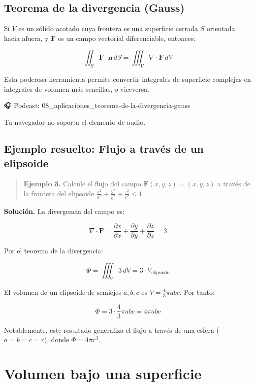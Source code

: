 \documentclass[
]{book}
\begin{document}
\subsection{Teorema de la divergencia (Gauss)}\label{teorema-de-la-divergencia-gauss}

Si \(V\) es un sólido acotado cuya frontera es una superficie cerrada \(S\) orientada hacia afuera, y \(\mathbf{F}\) es un campo vectorial diferenciable, entonces:

\[
\iint_S \mathbf{F} \cdot \mathbf{n} \, dS = \iiint_V \nabla \cdot \mathbf{F} \, dV
\]

Esta poderosa herramienta permite convertir integrales de superficie complejas en integrales de volumen más sencillas, o viceversa.

🎧 Podcast: 08\_aplicaciones\_teorema-de-la-divergencia-gauss

Tu navegador no soporta el elemento de audio.

\subsection{Ejemplo resuelto: Flujo a través de un elipsoide}\label{ejemplo-resuelto-flujo-a-travuxe9s-de-un-elipsoide}

\begin{quote}
\textbf{Ejemplo 3.} Calcule el flujo del campo \(\mathbf{F}(x, y, z) = (x, y, z)\) a través de la frontera del elipsoide \(\frac{x^2}{a^2} + \frac{y^2}{b^2} + \frac{z^2}{c^2} \leq 1\).
\end{quote}

\textbf{Solución.} La divergencia del campo es:

\[
\nabla \cdot \mathbf{F} = \frac{\partial x}{\partial x} + \frac{\partial y}{\partial y} + \frac{\partial z}{\partial z} = 3
\]

Por el teorema de la divergencia:

\[
\Phi = \iiint_V 3 \, dV = 3 \cdot V_{\text{elipsoide}}
\]

El volumen de un elipsoide de semiejes \(a, b, c\) es \(V = \frac{4}{3}\pi abc\). Por tanto:

\[
\Phi = 3 \cdot \frac{4}{3}\pi abc = 4\pi abc
\]

Notablemente, este resultado generaliza el flujo a través de una esfera (\(a = b = c = r\)), donde \(\Phi = 4\pi r^3\).

\section{Volumen bajo una superficie}\label{volumen-bajo-una-superficie}
\end{document}
